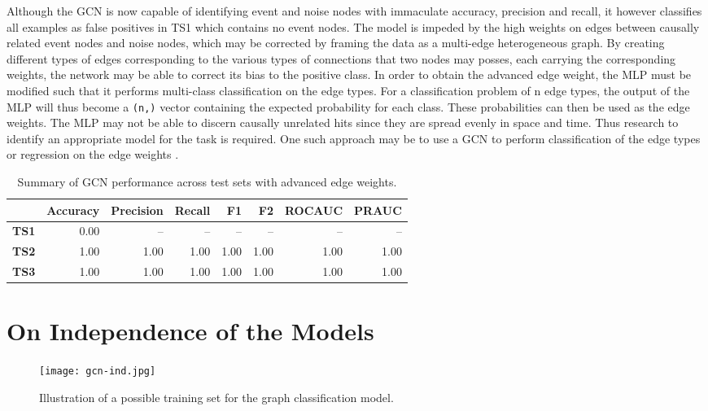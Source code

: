 Although the GCN is now capable of identifying event and noise nodes
with immaculate accuracy, precision and recall, it however classifies
all examples as false positives in TS1 which contains no event nodes.
The model is impeded by the high weights on edges between causally
related event nodes and noise nodes, which may be corrected by framing
the data as a multi-edge heterogeneous graph. By creating different
types of edges corresponding to the various types of connections that
two nodes may posses, each carrying the corresponding weights, the
network may be able to correct its bias to the positive class. In
order to obtain the advanced edge weight, the MLP must be modified
such that it performs multi-class classification on the edge types.
For a classification problem of n edge types, the output of the MLP
will thus become a \texttt{(n,)} vector containing the expected
probability for each class. These probabilities can then be used as
the edge weights. The MLP may not be able to discern causally
unrelated hits since they are spread evenly in space and time. Thus
research to identify an appropriate model for the task is required.
One such approach may be to use a GCN to perform classification of the
edge types or regression on the edge weights
\cite{gong2019exploiting}.

\begin{table}[htb]
  \centering
  \caption{Summary of GCN performance across test sets with advanced
    edge weights.}
  \begin{tabular}{lrrrrrrr}
    \hline
    & Accuracy & Precision & Recall & F1 & F2 & ROCAUC & PRAUC \\
    \hline
    \textbf{TS1} & 0.00 & -- & -- & -- & -- & -- & -- \\
    \textbf{TS2} & 1.00 & 1.00 & 1.00 & 1.00 & 1.00 & 1.00 & 1.00 \\
    \textbf{TS3} & 1.00 & 1.00 & 1.00 & 1.00 & 1.00 & 1.00 & 1.00 \\
    \hline
  \end{tabular}
  \label{tab:gcn-results-adv}
\end{table}

\section{On Independence of the Models}
\label{sec:rec-ind}

\begin{figure}[htb]
  \centering
  \texttt{[image: gcn-ind.jpg]}
  \caption{Illustration of a possible training set for the graph
    classification model.}
  \label{fig:gcn-ind}
\end{figure}
      
